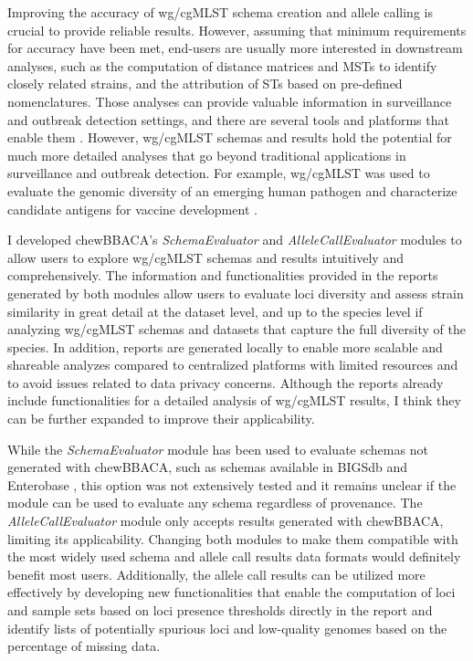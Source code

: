Improving the accuracy of \ac{wg/cgMLST} schema creation and allele calling is crucial to provide reliable results. However, assuming that minimum requirements for accuracy have been met, end-users are usually more interested in downstream analyses, such as the computation of distance matrices and \ac{MST}s to identify closely related strains, and the attribution of \ac{ST}s based on pre-defined nomenclatures. Those analyses can provide valuable information in surveillance and outbreak detection settings, and there are several tools and platforms that enable them \cite{nascimento_phyloviz_2017, ribeiro-goncalves_phyloviz_2016, zhou_grapetree_2018, mixao_reportree_2023, de_ruvo_spread_2024}. However, \ac{wg/cgMLST} schemas and results hold the potential for much more detailed analyses that go beyond traditional applications in surveillance and outbreak detection. For example, \ac{wg/cgMLST} was used to evaluate the genomic diversity of an emerging human pathogen and characterize candidate antigens for vaccine development \cite{isidro_virulence_2020, klimka_epitope-specific_2021, machimbirike_comparative_2021}.

I developed chewBBACA's \textit{SchemaEvaluator} and \textit{AlleleCallEvaluator} modules to allow users to explore \ac{wg/cgMLST} schemas and results intuitively and comprehensively. The information and functionalities provided in the reports generated by both modules allow users to evaluate loci diversity and assess strain similarity in great detail at the dataset level, and up to the species level if analyzing \ac{wg/cgMLST} schemas and datasets that capture the full diversity of the species. In addition, reports are generated locally to enable more scalable and shareable analyzes compared to centralized platforms with limited resources and to avoid issues related to data privacy concerns. Although the reports already include functionalities for a detailed analysis of \ac{wg/cgMLST} results, I think they can be further expanded to improve their applicability.

While the \textit{SchemaEvaluator} module has been used to evaluate schemas not generated with chewBBACA, such as schemas available in \ac{BIGSdb} and Enterobase \cite{jolley_bigsdb_2010, zhou_enterobase_2020}, this option was not extensively tested and it remains unclear if the module can be used to evaluate any schema regardless of provenance. The \textit{AlleleCallEvaluator} module only accepts results generated with chewBBACA, limiting its applicability. Changing both modules to make them compatible with the most widely used schema and allele call results data formats would definitely benefit most users. Additionally, the allele call results can be utilized more effectively by developing new functionalities that enable the computation of loci and sample sets based on loci presence thresholds directly in the report and identify lists of potentially spurious loci and low-quality genomes based on the percentage of missing data.

